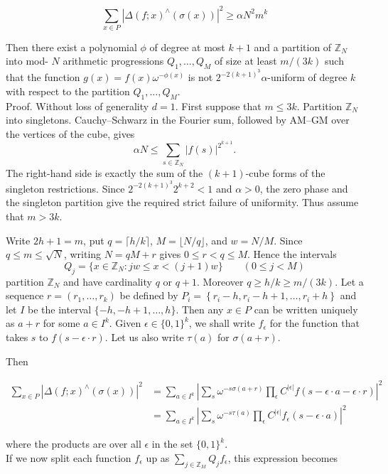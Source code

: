 \documentclass[10pt]{article}
\begin{document}
$$
\sum_{x \in P}\left|\Delta(f ; x)^{\wedge}(\sigma(x))\right|^{2} \geqslant \alpha N^{2} m^{k}
$$

Then there exist a polynomial $\phi$ of degree at most $k+1$ and a partition of $\mathbb{Z}_{N}$ into mod- $N$ arithmetic progressions $Q_{1}, \ldots, Q_{M}$ of size at least $m /(3 k)$ such that the function $g(x)=f(x) \omega^{-\phi(x)}$ is not $2^{-2(k+1)^{3}} \alpha$-uniform of degree $k$ with respect to the partition $Q_{1}, \ldots, Q_{M}$.\\
Proof. Without loss of generality $d=1$. First suppose that $m\leqslant3k$.  Partition $\mathbb Z_N$ into singletons.  Cauchy--Schwarz in the Fourier sum, followed by AM--GM over the vertices of the cube, gives
\[
 \alpha N\leqslant\sum_{s\in\mathbb Z_N}|f(s)|^{2^{k+1}}.
\]
The right-hand side is exactly the sum of the $(k+1)$-cube forms of the singleton restrictions.  Since $2^{-2(k+1)^3}2^{k+2}<1$ and $\alpha>0$, the zero phase and the singleton partition give the required strict failure of uniformity.  Thus assume that $m>3k$.

Write $2h+1=m$, put $q=\lceil h/k\rceil$, $M=\lfloor N/q\rfloor$, and $w=N/M$.  Since $q\leqslant m\leqslant\sqrt N$, writing $N=qM+r$ gives $0\leqslant r<q\leqslant M$.  Hence the intervals
\[
 Q_j=\{x\in\mathbb Z_N:jw\leqslant x<(j+1)w\}\qquad(0\leqslant j<M)
\]
partition $\mathbb Z_N$ and have cardinality $q$ or $q+1$.  Moreover $q\geqslant h/k\geqslant m/(3k)$.  Let a sequence $r=\left(r_{1}, \ldots, r_{k}\right)$ be defined by $P_{i}=\left\{r_{i}-h, r_{i}-h+1, \ldots, r_{i}+h\right\}$ and let $I$ be the interval $\{-h,-h+1, \ldots, h\}$. Then any $x \in P$ can be written uniquely as $a+r$ for some $a \in I^{k}$. Given $\epsilon \in\{0,1\}^{k}$, we shall write $f_{\epsilon}$ for the function that takes $s$ to $f(s-\epsilon \cdot r)$. Let us also write $\tau(a)$ for $\sigma(a+r)$.

Then

$$
\begin{aligned}
\sum_{x \in P}\left|\Delta(f ; x)^{\wedge}(\sigma(x))\right|^{2} & =\sum_{a \in I^{k}}\left|\sum_{s} \omega^{-s \sigma(a+r)} \prod_{\epsilon} C^{|\epsilon|} f(s-\epsilon \cdot a-\epsilon \cdot r)\right|^{2} \\
& =\sum_{a \in I^{k}}\left|\sum_{s} \omega^{-s \tau(a)} \prod_{\epsilon} C^{|\epsilon|} f_{\epsilon}(s-\epsilon \cdot a)\right|^{2}
\end{aligned}
$$

where the products are over all $\epsilon$ in the set $\{0,1\}^{k}$.\\
If we now split each function $f_{\epsilon}$ up as $\sum_{j \in \mathbb{Z}_{M}} Q_{j} f_{\epsilon}$, this expression becomes
\end{document}
